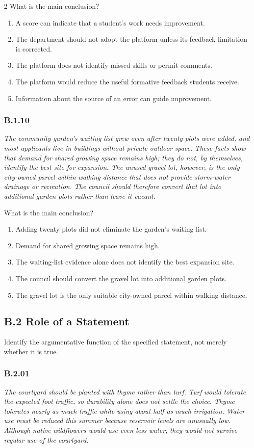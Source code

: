 \documentclass[10pt]{extarticle}
\newcommand{\choice}[1]{\item #1}
\newcommand{\bankitem}[1]{\subsubsection*{#1}}
\begin{document}
\begin{multicols}{2}
What is the main conclusion?
\begin{enumerate}[label=(\alph*)]
  \choice{A score can indicate that a student's work needs improvement.}
  \choice{The department should not adopt the platform unless its feedback limitation is corrected.}
  \choice{The platform does not identify missed skills or permit comments.}
  \choice{The platform would reduce the useful formative feedback students receive.}
  \choice{Information about the source of an error can guide improvement.}
\end{enumerate}
\bankitem{B.1.10}
\emph{The community garden's waiting list grew even after twenty plots were added, and most applicants live in buildings without private outdoor space. These facts show that demand for shared growing space remains high; they do not, by themselves, identify the best site for expansion. The unused gravel lot, however, is the only city-owned parcel within walking distance that does not provide storm-water drainage or recreation. The council should therefore convert that lot into additional garden plots rather than leave it vacant.}

What is the main conclusion?
\begin{enumerate}[label=(\alph*)]
  \choice{Adding twenty plots did not eliminate the garden's waiting list.}
  \choice{Demand for shared growing space remains high.}
  \choice{The waiting-list evidence alone does not identify the best expansion site.}
  \choice{The council should convert the gravel lot into additional garden plots.}
  \choice{The gravel lot is the only suitable city-owned parcel within walking distance.}
\end{enumerate}
\subsection*{B.2 Role of a Statement}
Identify the argumentative function of the specified statement, not merely whether it is true.
\bankitem{B.2.01}
\emph{The courtyard should be planted with thyme rather than turf. Turf would tolerate the expected foot traffic, so durability alone does not settle the choice. Thyme tolerates nearly as much traffic while using about half as much irrigation. Water use must be reduced this summer because reservoir levels are unusually low. Although native wildflowers would use even less water, they would not survive regular use of the courtyard.}


\end{multicols}
\end{document}
